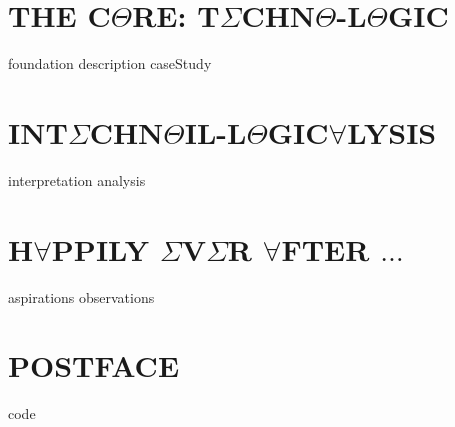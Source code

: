\documentclass{thesis} %
\begin{document}
\part{\texorpdfstring{THE C$\Theta$RE: T$\Sigma$CHN$\Theta$-L$\Theta$GIC}{THE CORE: TECHNO-LOGIC}}
{foundation}
{description}
{caseStudy}

\part{\texorpdfstring{INT$\Sigma$CHN$\Theta$IL-L$\Theta$GIC$\forall$LYSIS}{INTECHNOIL-LOGICALYSIS}}
{interpretation}
{analysis}

\part{\texorpdfstring{H$\forall$PPILY $\Sigma$V$\Sigma$R $\forall$FTER $\ldots$}{HAPPILY EVER AFTER...}}
{aspirations}
{observations}

\appendix

\part*{\texorpdfstring{POSTFACE}{POSTFACE}}
{code}
\clearpage

\pagestyle{plain}
{}
\clearpage

{}
\printnoidxglossary
\clearpage
\end{document}
